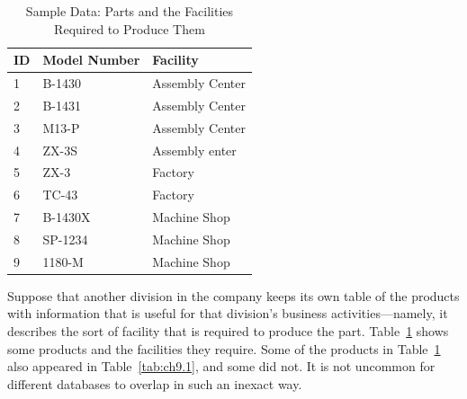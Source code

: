 \begin{table}
\label{tab:ch9.2}
\caption{Sample Data: Parts and the Facilities Required to Produce Them}
\begin{tabular}{|l l l|}
\hline
ID&Model Number&Facility\\
\hline
1&B-1430&Assembly Center\\
2&B-1431&Assembly Center\\
3&M13-P&Assembly Center\\
4&ZX-3S&Assembly enter\\
5&ZX-3&Factory\\
6&TC-43&Factory\\
7&B-1430X&Machine Shop\\
8&SP-1234&Machine Shop\\
9&1180-M&Machine Shop\\
\hline
\end{tabular}
\end{table}

Suppose that another division in the company keeps its own table of the
products with information that is useful for that division's business
activities---namely, it describes the sort of facility that is required
to produce the part. Table~\ref{tab:ch9.2} shows some products and the facilities
they require. Some of the products in Table~\ref{tab:ch9.2} also appeared in Table~\ref{tab:ch9.1}, and some did not. It is not uncommon for different databases to
overlap in such an inexact way.

